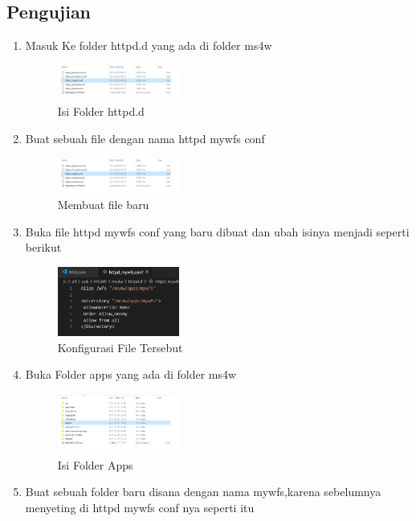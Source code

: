 \subsection{Pengujian}
\begin{enumerate}
  \item Masuk Ke folder httpd.d yang ada di folder ms4w
  \hfill\break
    \begin{figure}[H]
		\includegraphics[width=4cm]{figures/1174026/4/10.png}
		\centering
		\caption{Isi Folder httpd.d}
    \end{figure}
  \item Buat sebuah file dengan nama httpd mywfs conf
  \hfill\break
    \begin{figure}[H]
		\includegraphics[width=4cm]{figures/1174026/4/10.png}
		\centering
		\caption{Membuat file baru}
    \end{figure}
  \item Buka file httpd mywfs conf yang baru dibuat dan ubah isinya menjadi seperti berikut
  \hfill\break
    \begin{figure}[H]
		\includegraphics[width=4cm]{figures/1174026/4/11.png}
		\centering
		\caption{Konfigurasi File Tersebut}
    \end{figure}
  \item Buka Folder apps yang ada di folder ms4w
  \hfill\break
    \begin{figure}[H]
		\includegraphics[width=4cm]{figures/1174026/4/12.png}
		\centering
		\caption{Isi Folder Apps}
    \end{figure}
  \item Buat sebuah folder baru disana dengan nama mywfs,karena sebelumnya menyeting di httpd mywfs conf nya seperti itu

\end{enumerate}
